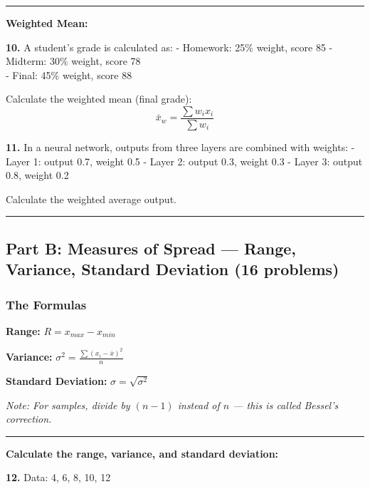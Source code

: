 \documentclass[
  11pt,
]{article}
\begin{document}
\begin{center}\rule{0.5\linewidth}{0.5pt}\end{center}

\textbf{Weighted Mean:}

\textbf{10.} A student's grade is calculated as: - Homework: 25\%
weight, score 85 - Midterm: 30\% weight, score 78\\
- Final: 45\% weight, score 88

Calculate the weighted mean (final grade):
\[\bar{x}_w = \frac{\sum w_i x_i}{\sum w_i}\]

\textbf{11.} In a neural network, outputs from three layers are combined
with weights: - Layer 1: output 0.7, weight 0.5 - Layer 2: output 0.3,
weight 0.3 - Layer 3: output 0.8, weight 0.2

Calculate the weighted average output.

\begin{center}\rule{0.5\linewidth}{0.5pt}\end{center}

\hypertarget{part-b-measures-of-spread-range-variance-standard-deviation-16-problems}{%
\subsection{Part B: Measures of Spread --- Range, Variance, Standard
Deviation (16
problems)}\label{part-b-measures-of-spread-range-variance-standard-deviation-16-problems}}

\hypertarget{the-formulas-1}{%
\subsubsection{The Formulas}\label{the-formulas-1}}

\textbf{Range:} \(R = x_{max} - x_{min}\)

\textbf{Variance:} \(\sigma^2 = \frac{\sum (x_i - \bar{x})^2}{n}\)

\textbf{Standard Deviation:} \(\sigma = \sqrt{\sigma^2}\)

\emph{Note: For samples, divide by \((n-1)\) instead of \(n\) --- this
is called Bessel's correction.}

\begin{center}\rule{0.5\linewidth}{0.5pt}\end{center}

\textbf{Calculate the range, variance, and standard deviation:}

\textbf{12.} Data: 4, 6, 8, 10, 12
\end{document}
